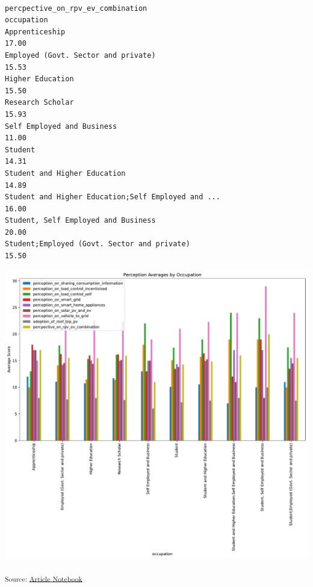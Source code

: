 \documentclass[
  letterpaper,
  DIV=11,
  numbers=noendperiod]{scrartcl}
\begin{document}
\begin{verbatim}
                                                    percpective_on_rpv_ev_combination  
occupation                                                                             
Apprenticeship                                                                  17.00  
Employed (Govt. Sector and private)                                             15.53  
Higher Education                                                                15.50  
Research Scholar                                                                15.93  
Self Employed and Business                                                      11.00  
Student                                                                         14.31  
Student and Higher Education                                                    14.89  
Student and Higher Education;Self Employed and ...                              16.00  
Student, Self Employed and Business                                             20.00  
Student;Employed (Govt. Sector and private)                                     15.50  
\end{verbatim}

\includegraphics{index_files/figure-pdf/cell-9-output-2.pdf}

\textsubscript{Source:
\href{https://sijuswamyresearch.github.io/SM-project/index-preview.html}{Article
Notebook}}
\end{document}
